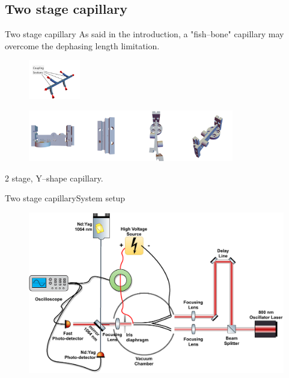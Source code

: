 \documentclass[dvipsnames]{beamer}
\begin{document}
\subsection{Two stage capillary}
\begin{frame}{Two stage capillary}
 As said in the introduction, a "fish--bone" capillary may overcome the dephasing length limitation.
   \begin{figure}
     \includegraphics[width=0.2\textwidth]{figures/theory/coupling_scheme.pdf}
   \end{figure}
   \begin{figure}
     \includegraphics[width=0.8\textwidth]{figures/results/2stageCapillary/doublecapillary_cad.png}
   \end{figure}
   2 stage, Y--shape capillary.
\end{frame}
\begin{frame}{Two stage capillary}{System setup}
\begin{figure}
    \includegraphics[width=\textwidth]{figures/results/2stageCapillary/setup.pdf}
\end{figure}
\end{frame}
\end{document}
